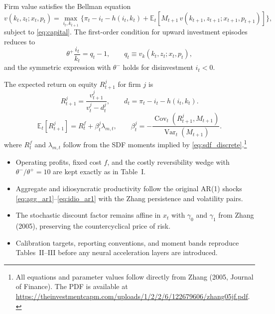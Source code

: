 \documentclass[11pt,a4paper]{article}
\numberwithin{equation}{section}
\begin{document}
Firm value satisfies the Bellman equation
\begin{equation}
  v(k_t, z_t; x_t, p_t) = \max_{i_t, k_{t+1}} \Big\{ \pi_t - i_t - h(i_t, k_t) + \mathbb E_t [ M_{t+1} \, v(k_{t+1}, z_{t+1}; x_{t+1}, p_{t+1}) ] \Big\},
  \label{eq:bellman}
\end{equation}
subject to \eqref{eq:capital}. The first-order condition for upward investment episodes reduces to
\begin{equation}
  \theta^+ \frac{i_t}{k_t} = q_t - 1, \qquad q_t \equiv v_k(k_t, z_t; x_t, p_t),
  \label{eq:foc_up}
\end{equation}
and the symmetric expression with \(\theta^-\) holds for disinvestment \(i_t < 0\).

The expected return on equity \(R_{t+1}^j\) for firm \(j\) is
\begin{equation}
  R_{t+1}^j = \frac{v_{t+1}^j}{v_t^j - d_t^j}, \qquad d_t = \pi_t - i_t - h(i_t, k_t).
  \label{eq:return}
\end{equation}
\begin{equation}
  \mathbb E_t[R_{t+1}^j] = R_t^f + \beta_t^j \lambda_{m,t}, \qquad \beta_t^j = -\frac{\operatorname{Cov}_t(R_{t+1}^j, M_{t+1})}{\operatorname{Var}_t(M_{t+1})}.
  \label{eq:return_decomp}
\end{equation}
where \(R_t^f\) and \(\lambda_{m,t}\) follow from the SDF moments implied by \eqref{eq:sdf_discrete}.\footnote{All equations and parameter values follow directly from Zhang (2005, Journal of Finance). The PDF is available at \url{https://theinvestmentcapm.com/uploads/1/2/2/6/122679606/zhang05jf.pdf}.}

\begin{notebox}[title={Non-Negotiable Zhang (2005) Invariants}]
\begin{itemize}
  \item Operating profits, fixed cost \(f\), and the costly reversibility wedge with \(\theta^- / \theta^+ = 10\) are kept exactly as in Table~I.
  \item Aggregate and idiosyncratic productivity follow the original AR(1) shocks \eqref{eq:agg_ar1}--\eqref{eq:idio_ar1} with the Zhang persistence and volatility pairs.
  \item The stochastic discount factor remains affine in \(x_t\) with \(\gamma_0\) and \(\gamma_1\) from Zhang (2005), preserving the countercyclical price of risk.
  \item Calibration targets, reporting conventions, and moment bands reproduce Tables~II--III before any neural acceleration layers are introduced.
\end{itemize}
\end{notebox}
\end{document}
